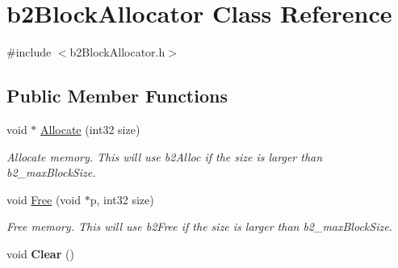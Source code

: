 \hypertarget{classb2BlockAllocator}{}\section{b2\+Block\+Allocator Class Reference}
\label{classb2BlockAllocator}


{\ttfamily \#include $<$b2\+Block\+Allocator.\+h$>$}

\subsection*{Public Member Functions}
\begin{DoxyCompactItemize}
\item 
\mbox{\label{classb2BlockAllocator_a437bf775c23f6e36af11a6d1653d7040}} 
void $\ast$ \mbox{\hyperlink{classb2BlockAllocator_a437bf775c23f6e36af11a6d1653d7040}{Allocate}} (int32 size)
\begin{DoxyCompactList}\small\item\em Allocate memory. This will use b2\+Alloc if the size is larger than b2\+\_\+max\+Block\+Size. \end{DoxyCompactList}\item 
\mbox{\label{classb2BlockAllocator_a945fdf86e260318b930a53dcc887ca8b}} 
void \mbox{\hyperlink{classb2BlockAllocator_a945fdf86e260318b930a53dcc887ca8b}{Free}} (void $\ast$p, int32 size)
\begin{DoxyCompactList}\small\item\em Free memory. This will use b2\+Free if the size is larger than b2\+\_\+max\+Block\+Size. \end{DoxyCompactList}\item 
\mbox{\label{classb2BlockAllocator_a3d3bac86217eba9d1eb6dff2acee0d77}} 
void {\bfseries Clear} ()
\end{DoxyCompactItemize}
